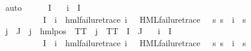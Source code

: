\begin{isabellebody}
\ auto\isanewline
\ \ \isamarkupfalse%
\ {\isachardoublequoteopen}{\isasymPhi}\ {\isacharbackquote}{\kern0pt}\ I\ {\isacharequal}{\kern0pt}\ {\isacharbraceleft}{\kern0pt}{\isacharbraceright}{\kern0pt}{\isachardoublequoteclose}\isanewline
{\isacharbar}{\kern0pt}\ {\isachardoublequoteopen}{\isacharparenleft}{\kern0pt}{\isasymexists}i{\isasymin}{\isasymPhi}\ {\isacharbackquote}{\kern0pt}\ I{\isachardot}{\kern0pt}\isanewline
\ \ \ \ \ \ \ \ {\isasymPhi}\ {\isacharbackquote}{\kern0pt}\ I\ {\isacharequal}{\kern0pt}\ {\isacharbraceleft}{\kern0pt}i{\isacharbraceright}{\kern0pt}\ {\isasymand}\ hml{\isacharunderscore}{\kern0pt}failure{\isacharunderscore}{\kern0pt}trace\ i\ {\isasymand}\ {\isacharparenleft}{\kern0pt}{\isasymexists}{\isasympsi}{\isachardot}{\kern0pt}\ HML{\isacharunderscore}{\kern0pt}failure{\isacharunderscore}{\kern0pt}trace\ {\isasympsi}\ {\isasymand}\ {\isacharparenleft}{\kern0pt}{\isasymforall}s{\isachardot}{\kern0pt}\ {\isacharparenleft}{\kern0pt}s\ {\isasymTurnstile}\ i{\isacharparenright}{\kern0pt}\ {\isacharequal}{\kern0pt}\ {\isacharparenleft}{\kern0pt}s\ {\isasymTurnstile}\ {\isasympsi}{\isacharparenright}{\kern0pt}{\isacharparenright}{\kern0pt}{\isacharparenright}{\kern0pt}{\isacharparenright}{\kern0pt}\isanewline
{\isasymand}\ {\isacharparenleft}{\kern0pt}{\isasymforall}j{\isasymin}{\isasymPhi}\ {\isacharbackquote}{\kern0pt}\ J{\isachardot}{\kern0pt}\ {\isasymexists}{\isasymalpha}{\isachardot}{\kern0pt}\ j\ {\isacharequal}{\kern0pt}\ hml{\isacharunderscore}{\kern0pt}pos\ {\isasymalpha}\ TT\ {\isasymor}\ j\ {\isacharequal}{\kern0pt}\ TT{\isacharparenright}{\kern0pt}\ {\isasymand}\ I\ {\isasyminter}\ J\ {\isacharequal}{\kern0pt}\ {\isacharbraceleft}{\kern0pt}{\isacharbraceright}{\kern0pt}{\isachardoublequoteclose}\isanewline
{\isacharbar}{\kern0pt}\ {\isachardoublequoteopen}{\isacharparenleft}{\kern0pt}{\isasymexists}i{\isasymin}{\isasymPhi}\ {\isacharbackquote}{\kern0pt}\ I{\isachardot}{\kern0pt}\isanewline
\ \ \ \ \ \ \ \ {\isasymPhi}\ {\isacharbackquote}{\kern0pt}\ I\ {\isacharequal}{\kern0pt}\ {\isacharbraceleft}{\kern0pt}i{\isacharbraceright}{\kern0pt}\ {\isasymand}\ hml{\isacharunderscore}{\kern0pt}failure{\isacharunderscore}{\kern0pt}trace\ i\ {\isasymand}\ {\isacharparenleft}{\kern0pt}{\isasymexists}{\isasympsi}{\isachardot}{\kern0pt}\ HML{\isacharunderscore}{\kern0pt}failure{\isacharunderscore}{\kern0pt}trace\ {\isasympsi}\ {\isasymand}\ {\isacharparenleft}{\kern0pt}{\isasymforall}s{\isachardot}{\kern0pt}\ {\isacharparenleft}{\kern0pt}s\ {\isasymTurnstile}\ i{\isacharparenright}{\kern0pt}\ {\isacharequal}{\kern0pt}\ {\isacharparenleft}{\kern0pt}s\ {\isasymTurnstile}\ {\isasympsi}{\isacharparenright}{\kern0pt}{\isacharparenright}{\kern0pt}{\isacharparenright}{\kern0pt}{\isacharparenright}{\kern0pt}\isanewline

\end{isabellebody}
